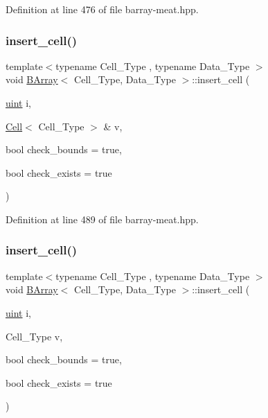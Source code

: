 Definition at line 476 of file barray-\/meat.\+hpp.

\mbox{\label{class_b_array_ac631a7a4b7308b00073a5e521d548933}} 
\subsubsection{\texorpdfstring{insert\+\_\+cell()}{insert\_cell()}\hspace{0.1cm}{\footnotesize\ttfamily [4/10]}}
{\footnotesize\ttfamily template$<$typename Cell\+\_\+\+Type , typename Data\+\_\+\+Type $>$ \\
void \hyperlink{class_b_array}{B\+Array}$<$ Cell\+\_\+\+Type, Data\+\_\+\+Type $>$\+::insert\+\_\+cell (\begin{DoxyParamCaption}\item[{\hyperlink{typedefs_8hpp_a91ad9478d81a7aaf2593e8d9c3d06a14}{uint}}]{i,  }\item[{\hyperlink{class_cell}{Cell}$<$ Cell\+\_\+\+Type $>$ \&}]{v,  }\item[{bool}]{check\+\_\+bounds = {\ttfamily true},  }\item[{bool}]{check\+\_\+exists = {\ttfamily true} }\end{DoxyParamCaption})\hspace{0.3cm}{\ttfamily [inline]}}



Definition at line 489 of file barray-\/meat.\+hpp.

\mbox{\label{class_b_array_aeeee5972aa4301465b84dfc431fa6cf9}} 
\subsubsection{\texorpdfstring{insert\+\_\+cell()}{insert\_cell()}\hspace{0.1cm}{\footnotesize\ttfamily [5/10]}}
{\footnotesize\ttfamily template$<$typename Cell\+\_\+\+Type , typename Data\+\_\+\+Type $>$ \\
void \hyperlink{class_b_array}{B\+Array}$<$ Cell\+\_\+\+Type, Data\+\_\+\+Type $>$\+::insert\+\_\+cell (\begin{DoxyParamCaption}\item[{\hyperlink{typedefs_8hpp_a91ad9478d81a7aaf2593e8d9c3d06a14}{uint}}]{i,  }\item[{Cell\+\_\+\+Type}]{v,  }\item[{bool}]{check\+\_\+bounds = {\ttfamily true},  }\item[{bool}]{check\+\_\+exists = {\ttfamily true} }\end{DoxyParamCaption})\hspace{0.3cm}{\ttfamily [inline]}}



